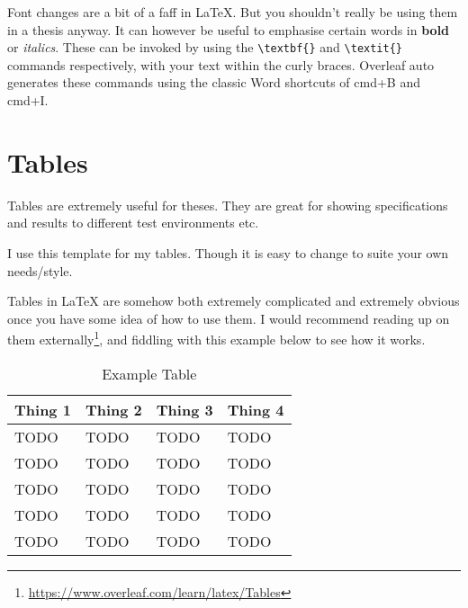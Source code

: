 Font changes are a bit of a faff in \LaTeX{}. But you shouldn't really be using them in a thesis anyway. It can however be useful to emphasise certain words in \textbf{bold} or \textit{italics}. These can be invoked by using the \verb+\textbf{}+ and \verb+\textit{}+ commands respectively, with your text within the curly braces. Overleaf auto generates these commands using the classic Word shortcuts of cmd+B and cmd+I.

\section{Tables}

Tables are extremely useful for theses. They are great for showing specifications and results to different test environments etc.

I use this template for my tables. Though it is easy to change to suite your own needs/style.

Tables in \LaTeX{} are somehow both extremely complicated and extremely obvious once you have some idea of how to use them. I would recommend reading up on them externally\footnote{\url{https://www.overleaf.com/learn/latex/Tables}}, and fiddling with this example below to see how it works.

\begin{table} [H] %
    \centering %
    \begin{tabular}{p{3.75cm}|p{3.75cm}|p{3.75cm}|p{3.75cm}} %
    
        \textbf{Thing 1} & \textbf{Thing 2}& \textbf{Thing 3} & \textbf{Thing 4}\\
        \hline %
        TODO& TODO& TODO & TODO\\
        TODO& TODO& TODO& TODO\\
        TODO & TODO & TODO & TODO\\
        TODO& TODO & TODO& TODO\\
        TODO & TODO & TODO & TODO
        
        \end{tabular}
    \caption{Example Table}
    \label{tab:ex_tab}
\end{table}


